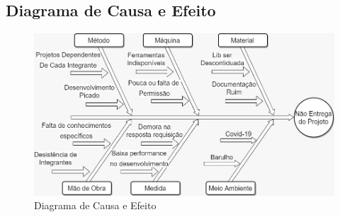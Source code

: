 {\subsection{Diagrama de Causa e Efeito}
\begin{figure}[htb]
	\caption{\label{causaeefeito1}Diagrama de Causa e Efeito}
	\begin{center}
		\includegraphics[scale=0.55]{./Figuras/Diagrama causa e efeito.jpeg}
	\end{center}
\end{figure}
}

